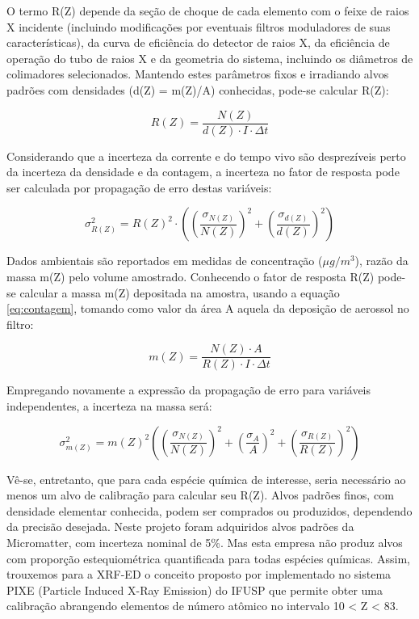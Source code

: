 O termo R(Z) depende da seção de choque de cada elemento com o feixe de 
raios X incidente (incluindo modificações por eventuais filtros moduladores 
de suas características), da curva de eficiência do detector de raios X, 
da eficiência de operação do tubo de raios X e da geometria do sistema, 
incluindo os diâmetros de colimadores selecionados. Mantendo estes parâmetros 
fixos e irradiando alvos padrões com densidades (d(Z) = m(Z)/A) 
conhecidas, pode-se calcular R(Z):

\begin{equation}
  \label{eq:fator_de_resposta}
  R(Z) = \frac{N(Z)}{d(Z) \cdot I \cdot \Delta t}
\end{equation}

Considerando que a incerteza da corrente e do tempo vivo são desprezíveis 
perto da incerteza da densidade e da contagem, a incerteza no fator de resposta
pode ser calculada por propagação de erro destas variáveis:

\begin{equation}
  \label{eq:erro_fator_de_resposta}
  \sigma_{R(Z)}^2 = {R(Z)}^2 \cdot \left( \left(\frac{\sigma_{N(Z)}}{N(Z)}\right)^2 + 
                                      \left(\frac{\sigma_{d(Z)}}{d(Z)}\right)^2 
                                   \right)
\end{equation}

Dados ambientais são reportados em medidas de concentração ($\mu g/m^3$),
razão da massa m(Z) pelo volume amostrado. Conhecendo o fator de resposta 
R(Z) pode-se calcular a massa m(Z) depositada na amostra, usando a equação 
\ref{eq:contagem}, tomando como valor da área A aquela da deposição de aerossol
no filtro:

\begin{equation}
  \label{eq:xrfedmassa}
  m(Z) = \frac{N(Z) \cdot A}{ R(Z) \cdot I \cdot \Delta t}
\end{equation}

Empregando novamente a expressão da propagação de erro para variáveis 
independentes, a incerteza na massa será:

\begin{equation}
  \label{eq:erro_massa}
  \sigma_{m(Z)}^2 = {m(Z)}^2 \left( \left(\frac{\sigma_{N(Z)}}{N(Z)}\right)^2 + 
                                  \left(\frac{\sigma_A}{A}\right)^2 + 
                                  \left(\frac{\sigma_{R(Z)}}{R(Z)}\right)^2 
                             \right)
\end{equation}


Vê-se, entretanto, que para cada espécie química de interesse, seria necessário
ao menos um alvo de calibração para calcular seu R(Z). Alvos padrões finos, 
com densidade elementar conhecida, podem ser comprados ou produzidos, dependendo
da precisão desejada. Neste projeto foram adquiridos alvos padrões da 
Micromatter, com incerteza nominal de 5\%. Mas esta empresa não produz alvos 
com proporção estequiométrica quantificada para todas espécies químicas.
Assim, trouxemos para a XRF-ED o conceito proposto por \citet{tabacniks2000}
implementado no sistema PIXE (Particle Induced X-Ray Emission) do IFUSP que permite obter uma 
calibração abrangendo elementos de número atômico no intervalo 10 < Z < 83. 
 
